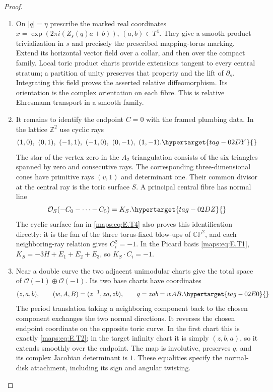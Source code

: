 \documentclass[11pt,a4paper]{article}
\numberwithin{equation}{section}
\theoremstyle{definition}
\begin{document}
\begin{proof}
\begin{enumerate}[label=\arabic*.,leftmargin=*]
\item On $|q|=\eta$ prescribe the marked real coordinates
$x=\exp(2\pi i(Z_s(q)a+b))$, $(a,b)\in T^4$.
They give a smooth product trivialization in $s$ and precisely
the prescribed mapping-torus marking.  Extend its horizontal
vector field over a collar, and then over the compact family.
Local toric product charts provide extensions tangent to
every central stratum; a partition of unity preserves that
property and the lift of $\partial_s$.  Integrating this
field proves the asserted relative diffeomorphism.  Its
orientation is the complex orientation on each fibre.
This is relative Ehresmann transport in a smooth
family.

\item It remains to identify the endpoint $C=0$ with the framed
plumbing data.  In the lattice $\mathbb Z^2$ use cyclic rays
\begin{equation}
 (1,0),\ (0,1),\ (-1,1),\ (-1,0),\ (0,-1),\ (1,-1).
 \hypertarget{tag-02DY}{}\label{maps:eq:E.T4}
\end{equation}
The star of the vertex zero in the $A_2$ triangulation consists
of the six triangles spanned by zero and consecutive rays.
The corresponding three-dimensional cones have primitive rays
$(v,1)$ and determinant one.  Their common divisor at the
central ray is the toric surface $S$.  A principal central
fibre has normal line
\begin{equation}
             \mathcal O_S(-C_0-\cdots-C_5)=K_S.
 \hypertarget{tag-02DZ}{}\label{maps:eq:E.T5}
\end{equation}
The cyclic surface fan in \eqref{maps:eq:E.T4} also proves this identification
directly: it is the fan of the three torus-fixed blow-ups of
$\mathbb {CP}^2$, and each neighboring-ray relation gives
$C_i^2=-1$.  In the Picard basis \eqref{maps:eq:E.T1},
$K_S=-3H+E_1+E_2+E_3$, so $K_S\cdot C_i=-1$.

\item Near a double curve the two adjacent unimodular charts give
the total space of $\mathcal O(-1)\oplus\mathcal O(-1)$.
Its two base charts have coordinates
\begin{equation}
 (z,a,b),\qquad
 (w,A,B)=(z^{-1},za,zb),\qquad q=zab=wAB.
 \hypertarget{tag-02E0}{}\label{maps:eq:E.T6}
\end{equation}
The period translation taking a neighboring component back
to the chosen component exchanges the two normal directions.
It reverses the chosen endpoint coordinate on the opposite
toric curve.  In the first chart this is exactly \eqref{maps:eq:E.T2};
in the target infinity chart it is simply $(z,b,a)$, so it
extends smoothly over the endpoint.  The map is involutive,
preserves $q$, and its complex Jacobian determinant is $1$.
These equalities specify the normal-disk attachment, including
its sign and angular twisting.


\end{enumerate}
\end{proof}
\end{document}
